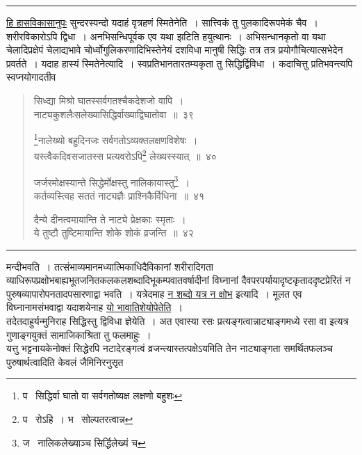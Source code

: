 \documentclass[11pt, openany]{book}
\begin{document}
\hrule

\vspace{2mm}
\noindent
\underline{हि हासविकासानुपः} सुन्दरस्पन्दो यदाहं वृत्रहणं स्मितेनेति~। सात्त्विकं तु पुलकादिरूपमेकं चैव~। शरीरविकारोऽपि द्विधा~। अनभिसन्धिपूर्वक एव यथा झटिति हयुत्थानः~। अभिसन्धानकृतो वा यथा चेलादिप्रक्षेपं चेलाद्यभावे चोर्ध्वोगुलिकरणादिभिस्तेनेयं दशविधा मानुषी सिद्धिः तत्र तत्र प्रयोगौचित्यात्सभेदेन प्रवर्तते~। यदाह हास्यं स्मितेनेत्यादि~। स्वप्रतिभानतारतम्यकृता तु सिद्धिर्द्विविधा~। कदाचित्तु प्रतिभवन्त्यपि स्वप्नयोगादतीव

\newpage

\begin{quote}
{\na सिध्द्या मिश्रो घातस्सर्वगतश्चैकदेशजो वापि~।\\
नाट्यकुशलैःसलेख्यासिद्धिर्वाख्याद्विघातोवा~॥~३९

\renewcommand{\thefootnote}{1}\footnote{प \textendash\  सिद्धिर्वा घातो वा सर्वगतोष्यक्ष लक्षणो बहुशः}नालेख्यो बहुदिनजः सर्वगतोऽव्यक्तलक्षणविशेषः~।\\
यस्त्वैकदिवसजातस्स प्रत्यवरोऽपि\renewcommand{\thefootnote}{2}\footnote{प \textendash\  रोऽहि~। भ \textendash\  सोल्पतरत्वान्न} लेख्यस्स्यात्~॥~४०

जर्जरमोक्षस्यान्ते सिद्धेर्मोक्षस्तु नालिकायास्तु\renewcommand{\thefootnote}{3}\footnote{ज \textendash\  नालिकलेख्याञ्च सिर्द्धिलेख्यं च}~।\\
कर्तव्यस्त्विह सततं नाट्यज्ञैः प्राश्निकैर्विधिना~॥~४१

दैन्ये दीनत्वमायान्ति ते नाट्ये प्रेक्षकाः स्मृताः~।\\
ये तुष्टौ तुष्टिमायान्ति शोके शोकं व्रजन्ति~॥~४२}
\end{quote}

\hrule

\vspace{2mm}
\noindent
मन्दीभवति~। तत्संभाव्यमानमध्यात्मिकाधिदैविकानां शरीरादिगता व्याधिरूपप्रक्षोभबाह्यभूतजनितकलकलशब्दादिभूकम्पवातवर्षादीनां विघ्नानां दैवपरपर्यायादृष्टकृताददृष्टप्रेरितं न पुरुषव्यापारोपनतादपसारणाद्वा भवति~। यत्रेदमाह \underline{न शब्दो यत्र न क्षोभ} इत्यादि~। मूलत एव विघ्नानामसंभवाद्वा यदाशयेनाह \underline{यो भावातिशेयोपेतेति}~।\\

तदेतदाहुर्यन्मुनिराह सिद्धिस्तु द्विविधा ज्ञेयेति~। अत एवास्या रसः प्रत्यङ्गत्वान्नाट्याङ्गमध्ये रसा वा इत्यत्र गुणाङ्गयुक्तं सामाजिकाश्रिता तु फलमाहुः~।\\

यत्तु भट्टनायकेनोक्तं {\qt सिद्धेरपि नटादेरङ्गत्वं व्रजन्त्यास्तत्पक्षेऽयमिति} तेन नाट्याङ्गता समर्थितफलञ्च पुरुषार्थत्वादिति केवलं जैमिनिरनुसृत
\end{document}
